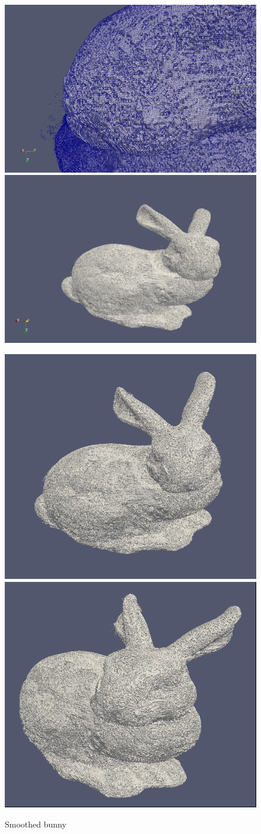 \begin{figure}[htb] %
   \centering
   \includegraphics[width=0.49\linewidth]{images/smoothed0.png}\hfill
   \includegraphics[width=0.49\linewidth]{images/smoothed1.png}\newline
   
   \includegraphics[width=0.49\linewidth]{images/smoothed2.png}\hfill
   \includegraphics[width=0.49\linewidth]{images/smoothed3.png}
   \caption[Smoothed bunny]{Smoothed bunny}
   \label{fig:smoothedBunny}
\end{figure}

